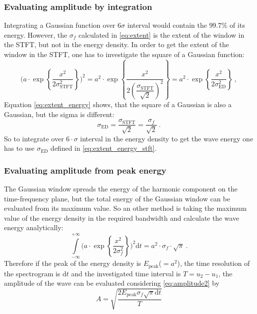 \documentclass[a4paper,12pt,oneside]{article}
\newcommand{\dt}{\mathrm{d}t}
\begin{document}
\subsubsection{Evaluating amplitude by integration}

Integrating a Gaussian function over $6 \sigma$ interval would contain the $99.7 \%$ of its energy. However, the $\sigma_{f}$ calculated in \eqref{eq:extent} is the extent of the window in the STFT, but not in the energy density. In order to get the extent of the window in the STFT, one has to investigate the square of a Gaussian function:
\begin{equation}\label{eq:extent_energy}
  \Bigg( a \cdot \exp\left\{ \frac{x^2}{2\sigma_{\textrm{STFT}}^2} \right\} \Bigg)^2 = 
  a^2 \cdot \exp\left\{ \frac{x^2}{2 \left( \dfrac{\sigma_{\textrm{STFT}}}{\sqrt{2}} \right)^2} \right\} =
  a^2 \cdot \exp\left\{ \frac{x^2}{2 \sigma_{\textrm{ED}}^2} \right\} \ ,
\end{equation}
Equation \eqref{eq:extent_energy} shows, that the square of a Gaussian is also a Gaussian, but the sigma is different:
\begin{equation}\label{eq:extent_energy_stft}
  \sigma_{\textrm{ED}} = \dfrac{\sigma_{\textrm{STFT}}}{\sqrt{2}}  = \dfrac{\sigma_f}{\sqrt{2}} \ .
\end{equation}
So to integrate over $6 \cdot \sigma$ interval in the energy density to get the wave energy one has to use $\sigma_{\textrm{ED}}$ defined in \eqref{eq:extent_energy_stft}.

\subsubsection{Evaluating amplitude from peak energy}

The Gaussian window spreads the energy of the harmonic component on the time-frequency plane, but the total energy of the Gaussian window can be evaluated from its maximum value. So an other method is taking the maximum value of the energy density in the required bandwidth and calculate the wave energy analytically:
\begin{equation}\label{eq:energy_analytical}
  \int\limits_{-\infty}^{+\infty} \Bigg( a \cdot \exp\left\{ \frac{x^2}{2\sigma_f^2} \right\} \Bigg)^2 \dt = 
  a^2 \cdot \sigma_f \cdot \sqrt{\pi} \ .
\end{equation}
Therefore if the peak of the energy density is $E_{\textrm{peak}}$($=a^2$), the time resolution of the spectrogram is $\dt$ and the investigated time interval is $T = u_2-u_1$, the amplitude of the wave can be evaluated considering \eqref{eq:amplitude2} by
\begin{equation}\label{amp_from_energy}
  A = \sqrt{ \frac{2 E_{\textrm{peak}} \sigma_f \sqrt{\pi} \dt}{T}}
\end{equation}
\end{document}
